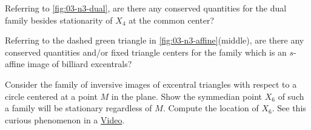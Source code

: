 \begin{question}
Referring to \cref{fig:03-n3-dual}, are there any conserved quantities for the dual family besides stationarity of $X_4$ at the common center?
\end{question}

\begin{question}
Referring to  the dashed green triangle in \cref{fig:03-n3-affine}(middle), are there any conserved quantities and/or fixed triangle centers for the family which is an $s$-affine image of billiard excentrals?
\end{question}

\begin{question}
Consider the family of inversive images of excentral triangles with respect to a circle centered at a point $M$ in the plane. Show the symmedian point $X_6$ of such a family will be stationary regardless of $M$. Compute the location of $X_6$. See this curious phenomenon in a \href{https://youtu.be/wwX_QfkjVi0}{Video}.
\end{question}